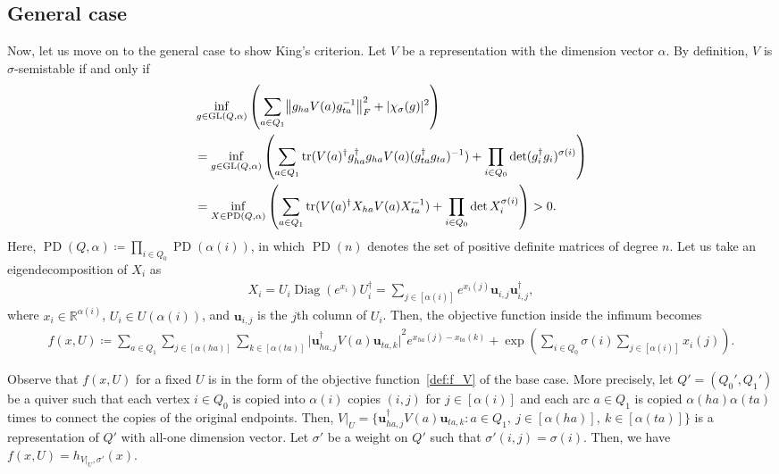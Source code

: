\documentclass[a4paper,11pt]{article}
\numberwithin{equation}{section}
\newcommand{\R}{\mathbb{R}}
\newcommand{\bu}{\mathbf{u}}
\DeclareMathOperator{\GL}{GL}
\DeclareMathOperator{\PD}{PD}
\DeclareMathOperator{\tr}{tr}
\DeclareMathOperator{\Diag}{Diag}
\DeclarePairedDelimiter{\norm}{\lVert}{\rVert}
\DeclarePairedDelimiter{\abs}{\lvert}{\rvert}
\begin{document}
\subsection{General case}

Now, let us move on to the general case to show King's criterion. 
Let $V$ be a representation with the dimension vector $\alpha$.
By definition, $V$ is $\sigma$-semistable if and only if
\begin{align}
    &\inf_{g \in \GL(Q, \alpha)} 
    \left( \sum_{a \in Q_1} \norm*{g_{ha}V(a)g_{ta}^{-1}}_F^2 + \abs{\chi_\sigma(g)}^2 \right) \\
    &=\inf_{g \in \GL(Q, \alpha)}\left( \sum_{a \in Q_1} \tr(V(a)^\dagger g_{ha}^\dagger g_{ha} V(a) (g_{ta}^\dagger g_{ta})^{-1}) + \prod_{i \in Q_0} \det (g_i^\dagger g_i)^{\sigma(i)} \right) \\
    &=\inf_{X \in \PD(Q, \alpha)}\left( \sum_{a \in Q_1} \tr(V(a)^\dagger X_{ha} V(a) X_{ta}^{-1}) + \prod_{i \in Q_0} \det X_i^{\sigma(i)} \right) > 0.
\end{align}
Here, $\PD(Q, \alpha) \coloneqq \prod_{i \in Q_0} \PD(\alpha(i))$, in which $\PD(n)$ denotes the set of positive definite matrices of degree $n$.
Let us take an eigendecomposition of $X_i$ as
\begin{align}
    X_i = U_i \Diag(e^{x_i}) U_i^\dagger = \sum_{j \in [\alpha(i)]} e^{x_{i}(j)} \bu_{i,j} \bu_{i,j}^\dagger,
\end{align}
where $x_i \in \R^{\alpha(i)}$, $U_i \in U(\alpha(i))$, and $\bu_{i,j}$ is the $j$th column of $U_i$.
Then, the objective function inside the infimum becomes
\begin{align}
    f(x, U) \coloneqq \sum_{a \in Q_1} \sum_{j \in [\alpha(ha)]} \sum_{k \in [\alpha(ta)]} {\bigl| \bu_{ha,j}^\dagger V(a) \bu_{ta,k} \bigr|}^2 e^{x_{ha}(j) - x_{ta}(k)} + \exp\left(\sum_{i \in Q_0} \sigma(i) \sum_{j \in [\alpha(i)]} x_{i}(j) \right).
\end{align}

Observe that $f(x, U)$ for a fixed $U$ is in the form of the objective function~\eqref{def:f_V} of the base case. 
More precisely, let $Q' = (Q_0', Q_1')$ be a quiver such that each vertex $i \in Q_0$ is copied into $\alpha(i)$ copies $(i, j)$ for $j \in [\alpha(i)]$ and each arc $a \in Q_1$ is copied $\alpha(ha)\alpha(ta)$ times to connect the copies of the original endpoints.
Then, $V|_U = \bigl\{\bu_{ha,j}^\dagger V(a) \bu_{ta,k} : a \in Q_1,\ j \in [\alpha(ha)],\ k \in [\alpha(ta)]\bigr\}$ is a representation of $Q'$ with all-one dimension vector.
Let $\sigma'$ be a weight on $Q'$ such that $\sigma'(i,j) = \sigma(i)$.
Then, we have $f(x, U) = h_{V|_U, \sigma'}(x)$.
\end{document}

